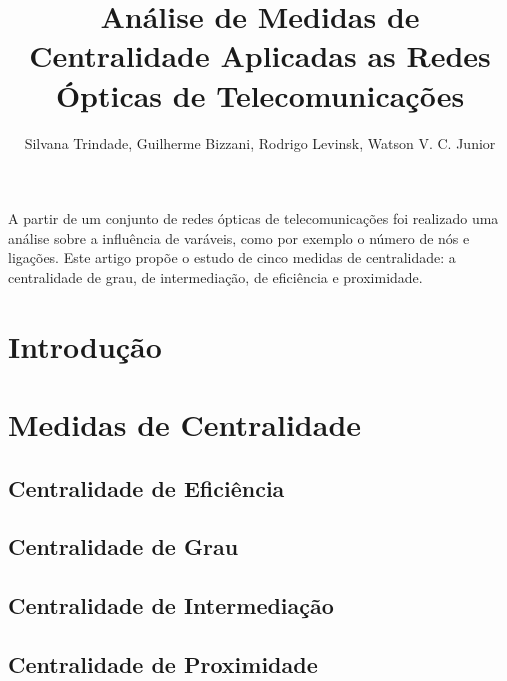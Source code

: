 \documentclass[12pt]{article}
\title{Análise de Medidas de Centralidade Aplicadas as Redes Ópticas de Telecomunicações}
\author{Silvana Trindade\inst{1}, Guilherme Bizzani\inst{1}, Rodrigo Levinsk\inst{1}, Watson V. C. Junior\inst{1}}
\begin{document}
 

\maketitle

\begin{abstract}
 
\end{abstract}
\begin{resumo} 
 A partir de um conjunto de redes ópticas de telecomunicações foi realizado uma análise sobre a influência de varáveis, como por exemplo o número de nós e ligações.
 Este artigo propõe o estudo de cinco medidas de centralidade: a centralidade de grau, de intermediação, de eficiência e proximidade.
\end{resumo}


\section{Introdução}

\section{Medidas de Centralidade}


\subsection{Centralidade de Eficiência}
\subsection{Centralidade de Grau}
\subsection{Centralidade de Intermediação}
\subsection{Centralidade de Proximidade}
\end{document}
